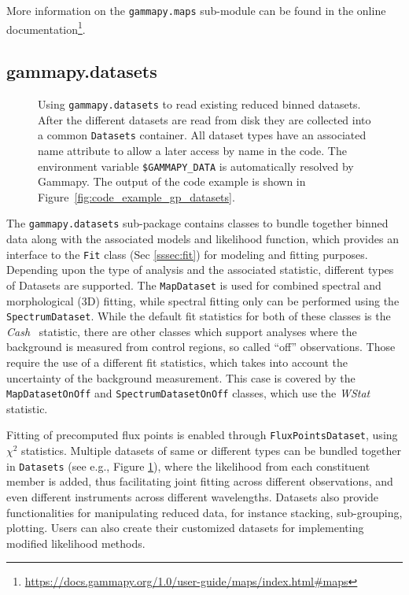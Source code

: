 \documentclass[longauth]{aa}
\newcommand{\code}[1]{\texttt{#1}}
\newcommand{\gammapy}{Gammapy\xspace}
\begin{document}
More information on the \code{gammapy.maps} sub-module can be found 
in the online documentation\footnote{\url{https://docs.gammapy.org/1.0/user-guide/maps/index.html\#maps}}.

\subsection{gammapy.datasets}
\label{ssec:gammapy-datasets}
%
\begin{figure}
        \small
        \caption{
        Using \code{gammapy.datasets} to read existing reduced binned datasets.
        After the different datasets are read from disk they are collected into a
        common \code{Datasets} container. All dataset types have an associated
        name attribute to allow a later access by name in the code. The
        environment variable \code{\$GAMMAPY\_DATA} is automatically resolved
        by \gammapy. The output
                of the code example is shown in Figure~\ref{fig:code_example_gp_datasets}.
    }
        \label{fig*:minted:gp_datasets}
\end{figure}
%
The \code{gammapy.datasets} sub-package contains classes to bundle
together binned data along with the associated models and likelihood function, which
provides an interface to the \code{Fit} class (Sec \ref{sssec:fit}) for
modeling and fitting purposes. Depending upon the type of analysis and the
associated statistic, different types of Datasets are supported. The \code{MapDataset} is
used for combined spectral and morphological (3D) fitting, while spectral 
fitting only can be performed using the \code{SpectrumDataset}.
While the default fit statistics for both of these classes is the \emph{Cash}~\citep{Cash}
statistic, there are other classes which support
analyses where the background is measured from control regions, so called \enquote{off} observations.
Those require the use of a different fit statistics, which takes into account the
uncertainty of the background measurement. This case is covered by the \code{MapDatasetOnOff}
and \code{SpectrumDatasetOnOff} classes, which use the \emph{WStat}~\citep{WStat} statistic.

Fitting of precomputed flux points is enabled through \code{FluxPointsDataset},
using \emph{$\chi^2$} statistics. Multiple datasets of same or different types can be
bundled together in \code{Datasets} (see e.g., Figure \ref{fig*:minted:gp_datasets}),
where the likelihood from each constituent member is added, thus facilitating
joint fitting across different observations, and even different instruments
across different wavelengths. Datasets also provide functionalities for
manipulating reduced data, for instance stacking, sub-grouping, plotting. Users can
also create their customized datasets for implementing modified likelihood
methods.
\end{document}

